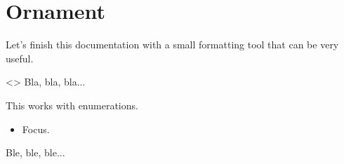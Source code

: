 \documentclass{tutodoc}
\begin{document}
\section{Ornament}

Let's finish this documentation with a small formatting tool that can be very useful.


\begin{tdoclatex}<>
Bla, bla, bla...

\tdocsep %

This works with enumerations.

\begin{itemize}
    \item Focus.
\end{itemize}

\tdocsep %

Ble, ble, ble...
\end{tdoclatex}
\end{document}
